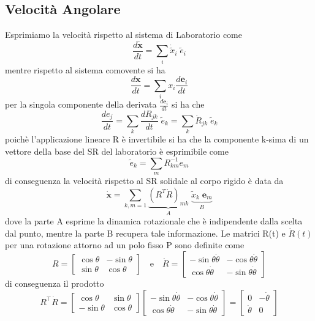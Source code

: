 \subsection{Velocit\`{a} Angolare}
Esprimiamo la velocit\`{a}  rispetto al sistema di Laboratorio come 
\begin{equation}
	\frac{d\bm \tilde{x}}{dt} = \sum_{i} \dot{\tilde{x}}_i \; \tilde{e}_{i}
\end{equation}
mentre rispetto al sistema comovente si ha 
\begin{equation}
	\frac{d\bm{x}}{dt} = \sum_{i} x_{i} \frac{d \bm{e}_i}{dt}
\end{equation}
per la singola componente della derivata $\frac{d \bm{e}_i}{dt}$ si ha che 
\begin{equation}
	\frac{d e_{j}}{dt} = \sum_{k} \frac{d R_{jk}}{dt} \; \tilde{e}_k = \sum_{k} \dot{R}_{jk} \; \tilde{e}_k
\end{equation}
poich\`{e} l'applicazione lineare R \`{e} invertibile si ha che la componente k-sima di un vettore della base del SR del laboratorio \`{e} esprimibile come 
\begin{equation}
	\tilde{e}_k =\sum_{m} R^{-1}_{km} e_m
\end{equation}
di conseguenza la velocit\`{a} rispetto al SR solidale al corpo rigido \`{e} data da 
\begin{equation}
	\dot{\bm{x}}= \sum_{k,m = 1}\underbrace{(R^T\dot{R})_{mk}}_{A} \; \underbrace{\tilde{x}_k \; \bm{e}_m}_{B}
\end{equation}
dove la parte A esprime la dinamica rotazionale che \`{e} indipendente dalla scelta dal punto, mentre la parte B recupera tale informazione. 
Le  matrici R(t) e $\dot{R}(t)$ per una rotazione attorno ad un polo fisso P sono definite come
\begin{equation}
R=\left[\begin{array}{cc}
\cos \theta & -\sin \theta \\
\sin \theta & \cos \theta 
\end{array}\right] \quad \text {e} \quad  \dot{R}=\left[\begin{array}{rr}
-\sin \theta \dot{\theta} & -\cos \theta \dot{\theta} \\
\cos \theta \dot{\theta} & -\sin \theta \dot{\theta}
\end{array}\right]
\end{equation}
di conseguenza il prodotto
\begin{equation}
R^{\top} \dot{R}=\left[\begin{array}{cc}
\cos \theta & \sin \theta \\
-\sin \theta & \cos \theta
\end{array}\right]\left[\begin{array}{cc}
-\sin \theta \dot{\theta} & -\cos \theta \dot{\theta} \\
\cos \theta \dot{\theta} & -\sin \theta \dot{\theta}
\end{array}\right] = 
\left[\begin{array}{cc}
0 & -\dot{\theta} \\
\dot{\theta} & 0
\end{array}\right]
\end{equation}
